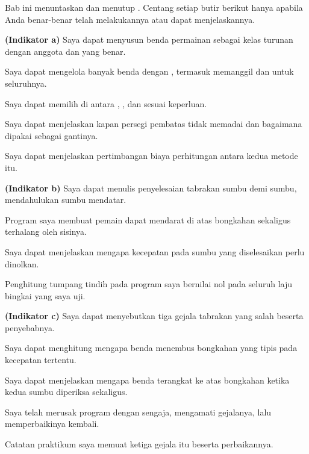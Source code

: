 
Bab ini menuntaskan  dan menutup . Centang setiap butir
berikut hanya apabila Anda benar-benar telah melakukannya atau dapat
menjelaskannya.

\begin{checklistbox}
\begin{checklist}
  \item {\bfseries (Indikator a)} Saya dapat menyusun benda permainan sebagai
        kelas turunan  dengan anggota
         dan  yang benar.
  \item Saya dapat mengelola banyak benda dengan ,
        termasuk memanggil  dan  untuk seluruhnya.
  \item Saya dapat memilih di antara ,
        , dan  sesuai keperluan.
  \item Saya dapat menjelaskan kapan persegi pembatas tidak memadai dan
        bagaimana  dipakai sebagai gantinya.
  \item Saya dapat menjelaskan pertimbangan biaya perhitungan antara kedua
        metode itu.
  \item {\bfseries (Indikator b)} Saya dapat menulis penyelesaian tabrakan
        sumbu demi sumbu, mendahulukan sumbu mendatar.
  \item Program saya membuat pemain dapat mendarat di atas bongkahan sekaligus
        terhalang oleh sisinya.
  \item Saya dapat menjelaskan mengapa kecepatan pada sumbu yang diselesaikan
        perlu dinolkan.
  \item Penghitung tumpang tindih pada program saya bernilai nol pada seluruh
        laju bingkai yang saya uji.
  \item {\bfseries (Indikator c)} Saya dapat menyebutkan tiga gejala tabrakan
        yang salah beserta penyebabnya.
  \item Saya dapat menghitung mengapa benda menembus bongkahan yang tipis pada
        kecepatan tertentu.
  \item Saya dapat menjelaskan mengapa benda terangkat ke atas bongkahan
        ketika kedua sumbu diperiksa sekaligus.
  \item Saya telah merusak program dengan sengaja, mengamati gejalanya, lalu
        memperbaikinya kembali.
  \item Catatan praktikum saya memuat ketiga gejala itu beserta perbaikannya.
\end{checklist}
\end{checklistbox}
